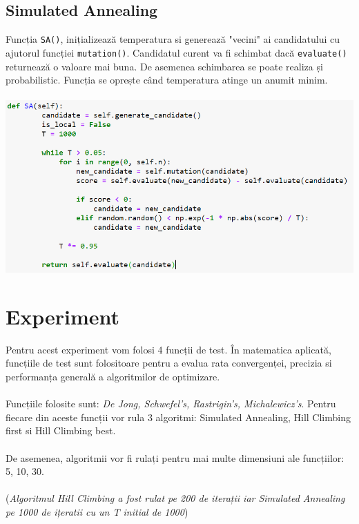 \documentclass{article}
\begin{document}
\subsection*{Simulated Annealing}
Funcția \texttt{SA()}, inițializează temperatura si generează "vecini" ai candidatului cu ajutorul funcției \texttt{mutation()}. Candidatul curent va fi schimbat dacă \texttt{evaluate()} returnează o valoare mai buna. De asemenea schimbarea se poate realiza și probabilistic. Funcția se oprește când temperatura atinge un anumit minim.\\\\
\includegraphics[width=\textwidth]{3j}\\



\section{Experiment}
Pentru acest experiment vom folosi 4 funcții de test. În matematica aplicată, funcțiile de test sunt folositoare pentru a evalua rata convergenței, precizia si performanța generală a algoritmilor de optimizare.\\\\
Funcțiile folosite sunt: \textit{De Jong, Schwefel's, Rastrigin's, Michalewicz's}. Pentru fiecare din aceste funcții vor rula 3 algoritmi: Simulated Annealing, Hill Climbing first si Hill Climbing best.\\\\
De asemenea, algoritmii vor fi rulați pentru mai multe dimensiuni ale funcțiilor: 5, 10, 30.\\\\
(\textit{Algoritmul Hill Climbing a fost rulat pe 200 de iterații iar Simulated Annealing pe 1000 de ițeratii cu un T initial de 1000})\\\\\\\
\end{document}
